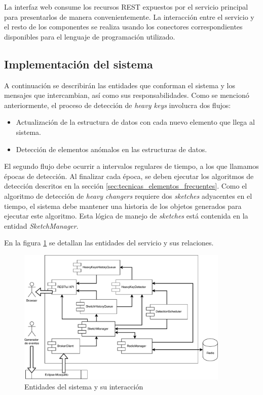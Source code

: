 \documentclass[a4paper,10pt, oneside]{article}
\begin{document}
La interfaz web consume los recursos REST expuestos por el servicio principal para presentarlos de manera convenientemente. La interacción entre el servicio y el resto de los componentes se realiza usando los conectores correspondientes disponibles para el lenguaje de programación utilizado.

\subsection{Implementación del sistema}
A continuación se describirán las entidades que conforman el sistema y los mensajes que intercambian, así como sus responsabilidades. Como se mencionó anteriormente, el proceso de detección de \textit{heavy keys} involucra dos flujos:
\begin{itemize}
	\item Actualización de la estructura de datos con cada nuevo elemento que llega al sistema.
	\item Detección de elementos anómalos en las estructuras de datos. 
\end{itemize}

El segundo flujo debe ocurrir a intervalos regulares de tiempo, a los que llamamos épocas de detección. Al finalizar cada época, se deben ejecutar los algoritmos de detección descritos en la sección \ref{sec:tecnicas_elementos_frecuentes}. Como el algoritmo de detección de \textit{heavy changers} requiere dos \textit{sketches} adyacentes en el tiempo, el sistema debe mantener una historia de los objetos generados para ejecutar este algoritmo. Esta lógica de manejo de \textit{sketches} está contenida en la entidad \textit{SketchManager}.

En la figura \ref{fig:system_components} se detallan las entidades del servicio y sus relaciones.
 
\begin{figure}[h]
	\centering
	\includegraphics[width=0.9\textwidth]{./graph/system_components.pdf}
	\caption{Entidades del sistema y su interacción}
	\label{fig:system_components}
\end{figure}
\end{document}

